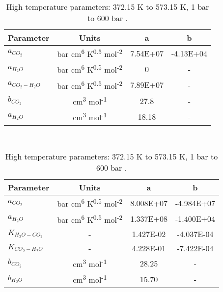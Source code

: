 \begin{table}[H]
    \caption{Low   temperature parameters: 285.15 K to 382.15 K , 1 bar to 600 bar \cite{Spycher2003}.}
    \centering
    \label{table:SRKDataLow}
    \begin{tabular}{|p{6em} c c c |}
        \hline
        \rowcolor{bluepoli!40} %
        \textbf{Parameter}& \textbf{Units} & \textbf{a} & \textbf{b} \T\B \\
        \hline \hline
        \(a_{CO_2}\) & bar cm\textsuperscript{6} K\textsuperscript{0.5} mol\textsuperscript{-2} & 7.54E+07 & -4.13E+04 \T\B \\
        \(a_{H_2O}\) & bar cm\textsuperscript{6} K\textsuperscript{0.5} mol\textsuperscript{-2} & 0 & - \T\B\\
        \(a_{CO_2-H_2O}\) & bar cm\textsuperscript{6} K\textsuperscript{0.5} mol\textsuperscript{-2} & 7.89E+07 & - \B\\
        \(b_{CO_2}\) & cm\textsuperscript{3} mol\textsuperscript{-1} & 27.8 & - \B\\
        \(a_{H_2O}\) & cm\textsuperscript{3} mol\textsuperscript{-1} & 18.18 & - \B\\
        \hline
    \end{tabular}
    \\[10pt]

    \caption{High   temperature parameters: 372.15 K to 573.15 K, 1 bar  to 600 bar \cite{Spycher2009}.}
    \centering 
    \label{table:SRKDataHigh}
    \begin{tabular}{|p{6em} c c c |}
        \hline
        \rowcolor{bluepoli!40} %
        \textbf{Parameter}& \textbf{Units} & \textbf{a} & \textbf{b} \T\B \\
        \hline \hline
        \(a_{CO_2}\) & bar cm\textsuperscript{6} K\textsuperscript{0.5} mol\textsuperscript{-2} & 8.008E+07 & -4.984E+07 \T\B \\
        \(a_{H_2O}\) & bar cm\textsuperscript{6} K\textsuperscript{0.5} mol\textsuperscript{-2} & 1.337E+08 & -1.400E+04 \T\B\\
        \(K_{H_2O-CO_2}\) & - & 1.427E-02 & -4.037E-04 \B\\
        \(K_{CO_2-H_2O}\) & - & 4.228E-01 & -7.422E-04 \B\\
        \(b_{CO_2}\) & cm\textsuperscript{3} mol\textsuperscript{-1} & 28.25 & - \B\\
        \(b_{H_2O}\) & cm\textsuperscript{3} mol\textsuperscript{-1} & 15.70 & - \B\\
        \hline
    \end{tabular}
    \\[10pt]
\end{table}